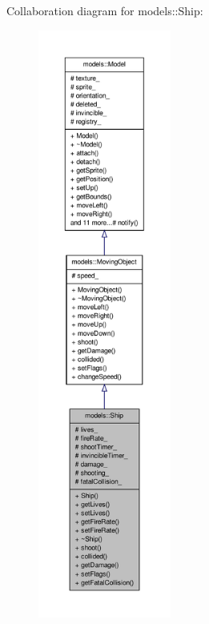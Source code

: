 \-Collaboration diagram for models\-:\-:\-Ship\-:
\nopagebreak
\begin{figure}[H]
\begin{center}
\leavevmode
\includegraphics[height=550pt]{d4/d0a/classmodels_1_1Ship__coll__graph}
\end{center}
\end{figure}
